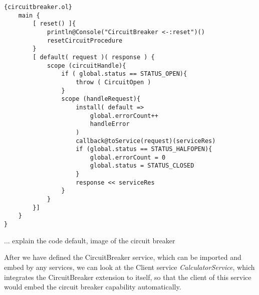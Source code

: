 \begin{listing}[ht]
\begin{lstlisting}[frame=tlrb,
basicstyle=\footnotesize]{circuitbreaker.ol}
    main {
        [ reset() ]{
            println@Console("CircuitBreaker <-:reset")()
            resetCircuitProcedure
        }
        [ default( request )( response ) {
            scope (circuitHandle){
                if ( global.status == STATUS_OPEN){
                    throw ( CircuitOpen )
                }
                scope (handleRequest){
                    install( default =>
                        global.errorCount++
                        handleError
                    )
                    callback@toService(request)(serviceRes)
                    if (global.status == STATUS_HALFOPEN){
                        global.errorCount = 0
                        global.status = STATUS_CLOSED
                    }
                    response << serviceRes
                }
            }
        }]
    }
}
\end{lstlisting}
\end{listing}

... explain the code default, image of the circuit breaker

After we have defined the CircuitBreaker service, which can be imported and embed by any services, we can look at the Client service \textit{CalculatorService}, which integrates the CircuitBreaker extension to itself, so that the client of this service would embed the circuit breaker capability automatically.

